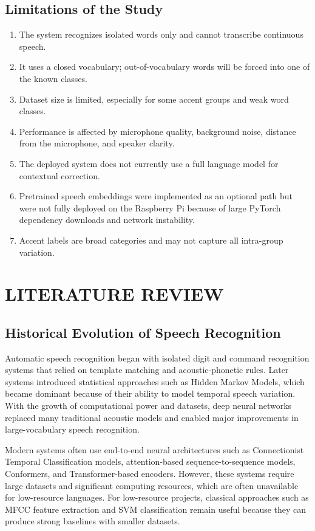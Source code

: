 \documentclass[12pt,a4paper]{report}
\begin{document}
\section{Limitations of the Study}
\begin{enumerate}[label=\alph*)]
    \item The system recognizes isolated words only and cannot transcribe continuous speech.
    \item It uses a closed vocabulary; out-of-vocabulary words will be forced into one of the known classes.
    \item Dataset size is limited, especially for some accent groups and weak word classes.
    \item Performance is affected by microphone quality, background noise, distance from the microphone, and speaker clarity.
    \item The deployed system does not currently use a full language model for contextual correction.
    \item Pretrained speech embeddings were implemented as an optional path but were not fully deployed on the Raspberry Pi because of large PyTorch dependency downloads and network instability.
    \item Accent labels are broad categories and may not capture all intra-group variation.
\end{enumerate}

\chapter{LITERATURE REVIEW}

\section{Historical Evolution of Speech Recognition}
Automatic speech recognition began with isolated digit and command recognition systems that relied on template matching and acoustic-phonetic rules. Later systems introduced statistical approaches such as Hidden Markov Models, which became dominant because of their ability to model temporal speech variation. With the growth of computational power and datasets, deep neural networks replaced many traditional acoustic models and enabled major improvements in large-vocabulary speech recognition.

Modern systems often use end-to-end neural architectures such as Connectionist Temporal Classification models, attention-based sequence-to-sequence models, Conformers, and Transformer-based encoders. However, these systems require large datasets and significant computing resources, which are often unavailable for low-resource languages. For low-resource projects, classical approaches such as MFCC feature extraction and SVM classification remain useful because they can produce strong baselines with smaller datasets.
\end{document}
